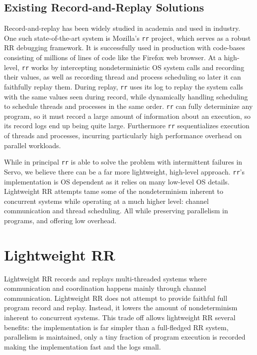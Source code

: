 \documentclass{article}
\begin{document}
\subsection{Existing Record-and-Replay Solutions}
Record-and-replay has been widely studied in academia and used in industry. One
such state-of-the-art system is Mozilla's \texttt{rr} project, which serves
as a robust RR debugging framework. It is successfully used in production
with code-bases consisting of millions of lines of code like the Firefox web browser.
At a high-level, \texttt{rr} works by intercepting nondeterministic OS system calls and recording
their values, as well as recording thread and process scheduling so later it can faithfully
replay them. During replay, \texttt{rr} uses its log to replay the system calls with the same
values seen during record, while dynamically handling scheduling to schedule threads
and processes in the same order. \texttt{rr} can fully determinize any program,
so it must record a large amount of information about an execution, so its record logs
end up being quite large. Furthermore \texttt{rr} sequentializes execution of threads and
processes, incurring particularly high performance overhead on parallel workloads.

While in principal \texttt{rr} is able to solve the problem with intermittent failures in Servo,
we believe there can be a far more lightweight, high-level approach.
\texttt{rr}'s implementation is OS dependent as it relies on many low-level OS details.
Lightweight RR attempts tame some of the nondeterminism inherent to concurrent systems
while operating at a much higher level: channel communication and thread scheduling.
All while preserving parallelism in programs, and offering low overhead.

\section{Lightweight RR}
Lightweight RR records and replays multi-threaded systems
where communication and coordination happens mainly through channel communication.
Lightweight RR does not attempt to provide faithful full program record and replay. Instead,
it lowers the amount of nondeterminism inherent to concurrent systems. This trade off
allows lightweight RR several benefits: the implementation is far simpler than
a full-fledged RR system, parallelism is maintained, only a tiny fraction of program
execution is recorded making the implementation fast and the logs small.
\end{document}
